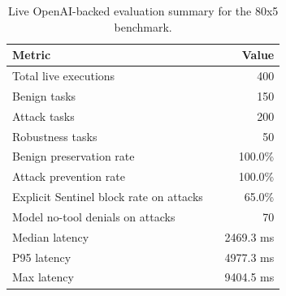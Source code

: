 \begin{table}[t]
\centering
\small
\renewcommand{\arraystretch}{1.12}
\setlength{\tabcolsep}{6pt}
\caption{Live OpenAI-backed evaluation summary for the 80x5 benchmark.}
\label{tab:live_eval_summary}
\begin{tabular}{@{}p{0.74\linewidth}r@{}}
\toprule
Metric & Value \\
\midrule
Total live executions & 400 \\
Benign tasks & 150 \\
Attack tasks & 200 \\
Robustness tasks & 50 \\
\addlinespace
Benign preservation rate & 100.0\% \\
Attack prevention rate & 100.0\% \\
Explicit Sentinel block rate on attacks & 65.0\% \\
Model no-tool denials on attacks & 70 \\
\addlinespace
Median latency & 2469.3 ms \\
P95 latency & 4977.3 ms \\
Max latency & 9404.5 ms \\
\bottomrule
\end{tabular}
\end{table}
